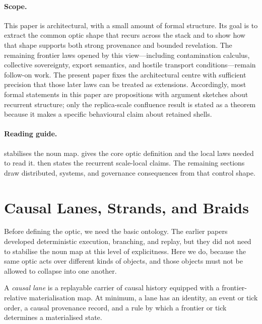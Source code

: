 \documentclass{aion}
\begin{document}
\paragraph{Scope.}
This paper is architectural, with a small amount of formal structure. Its goal is to extract the common optic shape that recurs across the \WARP{} stack and to show how that shape supports both strong provenance and bounded revelation. The remaining frontier laws opened by this view---including contamination calculus, collective sovereignty, export semantics, and hostile transport conditions---remain follow-on work. The present paper fixes the architectural centre with sufficient precision that those later laws can be treated as extensions. Accordingly, most formal statements in this paper are propositions with argument sketches about recurrent structure; only the replica-scale confluence result is stated as a theorem because it makes a specific behavioural claim about retained shells.

\paragraph{Reading guide.}
 stabilises the noun map.  gives the core optic definition and
the local laws needed to read it.  then states the recurrent
scale-local claims. The remaining sections draw distributed, systems, and
governance consequences from that control shape.

\clearpage
\section{Causal Lanes, Strands, and Braids}
\label{sec:nouns}

Before defining the optic, we need the basic ontology. The earlier papers developed deterministic execution, branching, and replay, but they did not need to stabilise the noun map at this level of explicitness. Here we do, because the same optic acts over different kinds of objects, and those objects must not be allowed to collapse into one another.

\begin{definition}
	A \emph{causal lane} is a replayable carrier of causal history equipped with a
	frontier-relative materialisation map. At minimum, a lane has an identity, an
	event or tick order, a causal provenance record, and a rule by which a frontier
	or tick determines a materialised state.
\end{definition}
\end{document}
